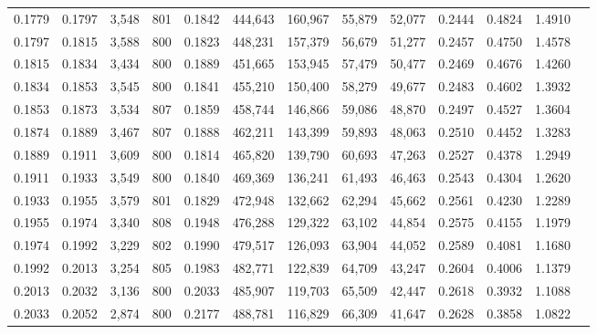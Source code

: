 \begin{tabular}{rrrrrrrrrrrrr}
0.1779 & 0.1797 &  3,548 & 801 &                                     0.1842 & 444,643 & 160,967 &  55,879 &  52,077 & 0.2444 & 0.4824 & 1.4910 \\
0.1797 & 0.1815 &  3,588 & 800 &                                     0.1823 & 448,231 & 157,379 &  56,679 &  51,277 & 0.2457 & 0.4750 & 1.4578 \\
0.1815 & 0.1834 &  3,434 & 800 &                                     0.1889 & 451,665 & 153,945 &  57,479 &  50,477 & 0.2469 & 0.4676 & 1.4260 \\
0.1834 & 0.1853 &  3,545 & 800 &                                     0.1841 & 455,210 & 150,400 &  58,279 &  49,677 & 0.2483 & 0.4602 & 1.3932 \\
0.1853 & 0.1873 &  3,534 & 807 &                                     0.1859 & 458,744 & 146,866 &  59,086 &  48,870 & 0.2497 & 0.4527 & 1.3604 \\
0.1874 & 0.1889 &  3,467 & 807 &                                     0.1888 & 462,211 & 143,399 &  59,893 &  48,063 & 0.2510 & 0.4452 & 1.3283 \\
0.1889 & 0.1911 &  3,609 & 800 &                                     0.1814 & 465,820 & 139,790 &  60,693 &  47,263 & 0.2527 & 0.4378 & 1.2949 \\
0.1911 & 0.1933 &  3,549 & 800 &                                     0.1840 & 469,369 & 136,241 &  61,493 &  46,463 & 0.2543 & 0.4304 & 1.2620 \\
0.1933 & 0.1955 &  3,579 & 801 &                                     0.1829 & 472,948 & 132,662 &  62,294 &  45,662 & 0.2561 & 0.4230 & 1.2289 \\
0.1955 & 0.1974 &  3,340 & 808 &                                     0.1948 & 476,288 & 129,322 &  63,102 &  44,854 & 0.2575 & 0.4155 & 1.1979 \\
0.1974 & 0.1992 &  3,229 & 802 &                                     0.1990 & 479,517 & 126,093 &  63,904 &  44,052 & 0.2589 & 0.4081 & 1.1680 \\
0.1992 & 0.2013 &  3,254 & 805 &                                     0.1983 & 482,771 & 122,839 &  64,709 &  43,247 & 0.2604 & 0.4006 & 1.1379 \\
0.2013 & 0.2032 &  3,136 & 800 &                                     0.2033 & 485,907 & 119,703 &  65,509 &  42,447 & 0.2618 & 0.3932 & 1.1088 \\
0.2033 & 0.2052 &  2,874 & 800 &                                     0.2177 & 488,781 & 116,829 &  66,309 &  41,647 & 0.2628 & 0.3858 & 1.0822 \\

\end{tabular}
